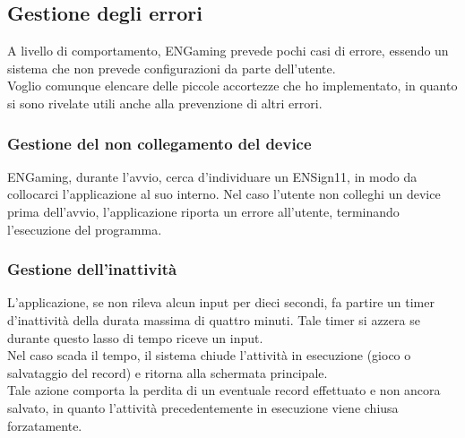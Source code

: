 \subsection{Gestione degli errori}
A livello di comportamento, ENGaming prevede pochi casi di errore, essendo un sistema che non prevede configurazioni da parte dell'utente.\\
Voglio comunque elencare delle piccole accortezze che ho implementato, in quanto si sono rivelate utili anche alla prevenzione di altri errori.
\subsubsection{Gestione del non collegamento del device}
ENGaming, durante l'avvio, cerca d'individuare un ENSign11, in modo da collocarci l'applicazione al suo interno. Nel caso l'utente non colleghi un device prima dell'avvio, l'applicazione riporta un errore all'utente, terminando l'esecuzione del programma.
\subsubsection{Gestione dell'inattività}
\label{sec:inactivity}
L'applicazione, se non rileva alcun input per dieci secondi, fa partire un timer d'inattività della durata massima di quattro minuti. Tale timer si azzera se durante questo lasso di tempo riceve un input.\\
Nel caso scada il tempo, il sistema chiude l'attività in esecuzione (gioco o salvataggio del record) e ritorna alla schermata principale.\\
Tale azione comporta la perdita di un eventuale record effettuato e non ancora salvato, in quanto l'attività precedentemente in esecuzione viene chiusa forzatamente.
